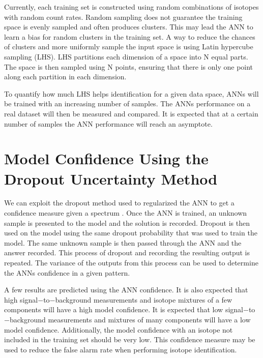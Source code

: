 \documentclass[tocnosub,noragright,centerchapter,12pt,fullpage]{uiucecethesis09}
\begin{document}

Currently, each training set is constructed using random combinations of isotopes with random count rates. Random sampling does not guarantee the training space is evenly sampled and often produces clusters. This may lead the ANN to learn a bias for random clusters in the training set. A way to reduce the chances of clusters and more uniformly sample the input space is using Latin hypercube sampling (LHS). LHS partitions each dimension of a space into N equal parts. The space is then sampled using N points, ensuring that there is only one point along each partition in each dimension. 


To quantify how much LHS helps identification for a given data space, ANNs will be trained with an increasing number of samples. The ANNs performance on a real dataset will then be measured and compared. It is expected that at a certain number of samples the ANN performance will reach an asymptote.



\section{Model Confidence Using the Dropout Uncertainty Method}

We can exploit the dropout method used to regularized the ANN to get a confidence measure given a spectrum \cite{Yarin2016}. Once the ANN is trained, an unknown sample is presented to the model and the solution is recorded. Dropout is then used on the model using the same dropout probability that was used to train the model. The same unknown sample is then passed through the ANN and the answer recorded. This process of dropout and recording the resulting output is repeated. The variance of the outputs from this process can be used to determine the ANNs confidence in a given pattern. 

A few results are predicted using the ANN confidence. It is also expected that high signal$-$to$-$background measurements and isotope mixtures of a few components will have a high model confidence. It is expected that low signal$-$to$-$background measurements and mixtures of many components will have a low model confidence. Additionally, the model confidence with an isotope not included in the training set should be very low. This confidence measure may be used to reduce the false alarm rate when performing isotope identification. 
\end{document}
